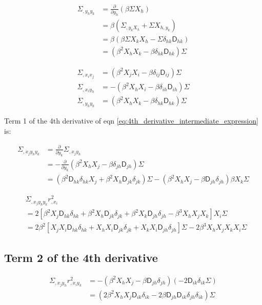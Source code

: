 \begin{align*}
\Sigma_{,y_h y_k} &= \frac{\partial}{\partial y_h} (\beta \Sigma X_h)\\
&= \beta(\Sigma_{,y_k X_h} + \Sigma X_{h, y_k})\\ 
&= \beta(\beta \Sigma X_k X_h - \Sigma \delta_{hk} \mathsf{D}_{hk}) \\ 
&= (\beta^2 X_h X_k - \beta \delta_{hk} \mathsf{D}_{hk})\Sigma 
\end{align*}

\begin{align}
\Sigma_{,x_i x_j} &= (\beta^2 X_j X_i - \beta \delta_{ij} \mathsf{D}_{ij})\Sigma\\ 
\Sigma_{,x_i y_h} &= -(\beta^2 X_h X_i - \beta \delta_{ih} \mathsf{D}_{ih})\Sigma\\ 
\Sigma_{,y_h y_k} &= (\beta^2 X_h X_k - \beta \delta_{hk} \mathsf{D}_{hk})\Sigma 
\end{align}

Term 1 of the 4th derivative of eqn
\ref{eq:4th_derivative_intermediate_expression} is:

\begin{align*}
\Sigma_{,x_j y_h y_k}
&= \frac{\partial}{\partial y_k} \Sigma_{,x_j y_h}\\ 
&= -\frac{\partial}{\partial y_k} (\beta^2 X_h X_j - \beta \delta_{jh} \mathsf{D}_{jh})\Sigma\\
&= (\beta^2 \mathsf{D}_{hk} \delta_{hk} X_j + \beta^2 X_h \mathsf{D}_{jk}\delta_{jk})\Sigma -
(\beta^2 X_h X_j - \beta \mathsf{D}_{jh} \delta_{jh})\beta X_k \Sigma
\end{align*}

\begin{align*}
&\Sigma_{,x_j y_h y_k} r_{,x_i}^2\\
&= 2[\beta^2 X_j \mathsf{D}_{hk} \delta_{hk} + \beta^2 X_h \mathsf{D}_{jk}\delta_{jk} +
\beta^2 X_k \mathsf{D}_{jh} \delta_{jh} - \beta^3 X_h X_j X_k] X_i \Sigma\\ 
&=\boxed{2\beta^2[ 
X_j X_i \mathsf{D}_{hk} \delta_{hk} + 
X_h X_i \mathsf{D}_{jk} \delta_{jk} + 
X_k X_i \mathsf{D}_{jh} \delta_{jh}] \Sigma 
- 2\beta^3 X_h X_j X_k X_i \Sigma} 
\end{align*}

\subsection{Term 2 of the 4th derivative}
\begin{align*}
\Sigma_{,x_j y_h} r^2_{,x_i y_k}
&= - (\beta^2 X_h X_j - \beta \mathsf{D}_{jh} \delta_{jh}) (-2\mathsf{D}_{ik}
\delta_{ik} \Sigma) \\  
&= \boxed{( 2 \beta^2  X_h X_j \mathsf{D}_{ik} \delta_{ik} 
-2 \beta \mathsf{D}_{jh} \mathsf{D}_{ik} \delta_{jh} \delta_{ik}) \Sigma} 
\end{align*}

